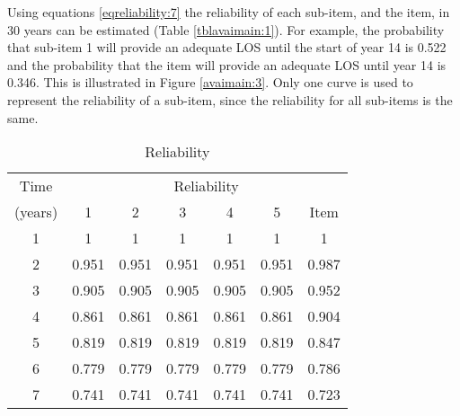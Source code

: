 Using equations \eqref{eqreliability:7} the reliability of each sub-item, and the item, in 30 years
can be estimated (Table \ref{tblavaimain:1}). For example, the probability that sub-item
1 will provide an adequate LOS until the start of year 14 is 0.522 and the
probability that the item will provide an adequate LOS until year 14 is 0.346.
This is illustrated in Figure \ref{avaimain:3}. Only one curve is used to represent
the reliability of a sub-item, since the reliability for all sub-items is the
same.
\begin{table}
\caption{Reliability}
\begin{tabular}{|l|l|l|l|l|l|l|}
\hline
\multicolumn{1}{|c|}{Time} & \multicolumn{6}{c|}{Reliability} \\ 
\cline{2-7}
\multicolumn{1}{|c|}{(years)} & \multicolumn{1}{c|}{1} & \multicolumn{1}{c|}{2} & \multicolumn{1}{c|}{3} & \multicolumn{1}{c|}{4} & \multicolumn{1}{c|}{5} & \multicolumn{1}{c|}{Item} \\ 
\hline
\multicolumn{1}{|c|}{1} & \multicolumn{1}{c|}{1} & \multicolumn{1}{c|}{1} & \multicolumn{1}{c|}{1} & \multicolumn{1}{c|}{1} & \multicolumn{1}{c|}{1} & \multicolumn{1}{c|}{1} \\ 
\hline
\multicolumn{1}{|c|}{2} & \multicolumn{1}{c|}{0.951} & \multicolumn{1}{c|}{0.951} & \multicolumn{1}{c|}{0.951} & \multicolumn{1}{c|}{0.951} & \multicolumn{1}{c|}{0.951} & \multicolumn{1}{c|}{0.987} \\ 
\hline
\multicolumn{1}{|c|}{3} & \multicolumn{1}{c|}{0.905} & \multicolumn{1}{c|}{0.905} & \multicolumn{1}{c|}{0.905} & \multicolumn{1}{c|}{0.905} & \multicolumn{1}{c|}{0.905} & \multicolumn{1}{c|}{0.952} \\ 
\hline
\multicolumn{1}{|c|}{4} & \multicolumn{1}{c|}{0.861} & \multicolumn{1}{c|}{0.861} & \multicolumn{1}{c|}{0.861} & \multicolumn{1}{c|}{0.861} & \multicolumn{1}{c|}{0.861} & \multicolumn{1}{c|}{0.904} \\ 
\hline
\multicolumn{1}{|c|}{5} & \multicolumn{1}{c|}{0.819} & \multicolumn{1}{c|}{0.819} & \multicolumn{1}{c|}{0.819} & \multicolumn{1}{c|}{0.819} & \multicolumn{1}{c|}{0.819} & \multicolumn{1}{c|}{0.847} \\ 
\hline
\multicolumn{1}{|c|}{6} & \multicolumn{1}{c|}{0.779} & \multicolumn{1}{c|}{0.779} & \multicolumn{1}{c|}{0.779} & \multicolumn{1}{c|}{0.779} & \multicolumn{1}{c|}{0.779} & \multicolumn{1}{c|}{0.786} \\ 
\hline
\multicolumn{1}{|c|}{7} & \multicolumn{1}{c|}{0.741} & \multicolumn{1}{c|}{0.741} & \multicolumn{1}{c|}{0.741} & \multicolumn{1}{c|}{0.741} & \multicolumn{1}{c|}{0.741} & \multicolumn{1}{c|}{0.723} \\ 

\end{tabular}
\end{table}
